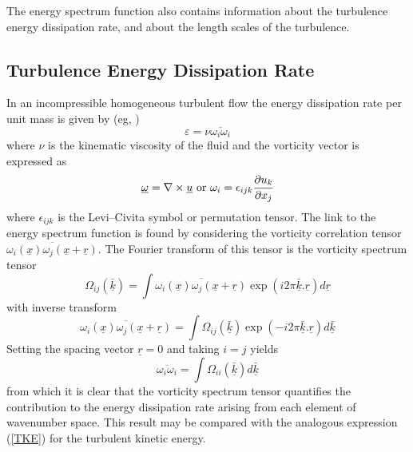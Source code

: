 \documentclass[dvips]{article}
\begin{document}
The energy spectrum function also contains information about the turbulence
energy dissipation rate, and about the length scales of the turbulence.

\subsection{Turbulence Energy Dissipation Rate}
In an incompressible homogeneous turbulent flow 
the energy dissipation rate per unit mass is given by (eg, \cite{hinze})
\begin{equation}
\varepsilon = \nu\overline{\omega_{i}\omega_{i}}
\label{DISSIP}
\end{equation}
where $\nu$ is the kinematic viscosity of the fluid and the vorticity
vector is expressed as
\begin{equation}
\underline{\omega} = \nabla \times \underline{u}{\rm\ or\ }\omega_{i}
= \epsilon_{ijk}\frac{\partial u_{k}}{\partial x_{j}}
\label{VORT}
\end{equation}
where $\epsilon_{ijk}$ is the Levi--Civita symbol or permutation tensor.
The link to the energy spectrum function is found by considering the vorticity
correlation tensor
$\overline{\omega_{i}(\underline{x})\omega_{j}(\underline{x}+\underline{r})}$.
The Fourier transform of this tensor is the vorticity spectrum tensor
\begin{equation}
\Omega_{ij}(\underline{\bar{k}}) = \int
\overline{\omega_{i}(\underline{x})\omega_{j}(\underline{x}+\underline{r})}
\exp{(i2\pi \underline{\bar{k}}.\underline{r})}
d\underline{r}
\label{VORTENS}
\end{equation}
with inverse transform
\begin{equation}
\overline{\omega_{i}(\underline{x})\omega_{j}(\underline{x}+\underline{r})}
= \int \Omega_{ij}(\underline{\bar{k}})
\exp{(-i2\pi \underline{\bar{k}}.\underline{r})}
d\underline{\bar{k}}
\label{VORTENSINV}
\end{equation}
Setting the spacing vector $\underline{r}=0$ and taking $i=j$ yields
\begin{equation}
\overline{\omega_{i}\omega_{i}}
= \int \Omega_{ii}(\underline{\bar{k}}) d\underline{\bar{k}}
\label{OMEGAS}
\end{equation}
from which it is clear that the vorticity spectrum tensor quantifies the
contribution to the energy dissipation rate arising from each element of
wavenumber space.  This result may be compared with the analogous
expression (\ref{TKE}) for the turbulent kinetic energy.
\end{document}
